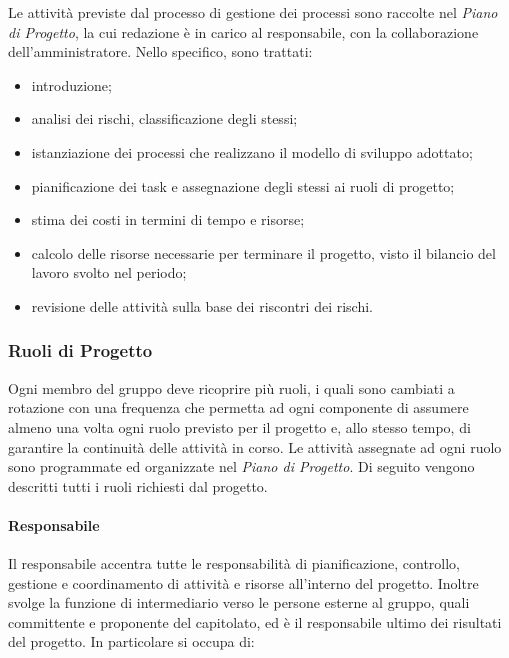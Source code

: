 		Le attività previste dal processo di gestione dei processi sono raccolte nel \textit{Piano di Progetto}, la cui redazione è in carico al responsabile, con la collaborazione dell'amministratore.\newline
		Nello specifico, sono trattati:
		
		\begin{itemize}
			\item introduzione;
			\item analisi dei rischi, classificazione degli stessi;
			\item istanziazione dei processi che realizzano il modello di sviluppo adottato;
			\item pianificazione dei task e assegnazione degli stessi ai ruoli di progetto;
			\item stima dei costi in termini di tempo e risorse;
			\item calcolo delle risorse necessarie per terminare il progetto, visto il bilancio del lavoro svolto nel periodo;
			\item revisione delle attività sulla base dei riscontri dei rischi.
		\end{itemize}
	
	\subsubsection{Ruoli di Progetto}
	
		Ogni membro del gruppo deve ricoprire più ruoli, i quali sono cambiati a rotazione con una frequenza che permetta ad ogni componente di assumere almeno una volta ogni ruolo previsto per il progetto e, allo stesso tempo, di garantire la continuità delle attività in corso.\newline
		Le attività assegnate ad ogni ruolo sono programmate ed organizzate nel \textit{Piano di Progetto}.\newline
		Di seguito vengono descritti tutti i ruoli richiesti dal progetto.
	
		\paragraph{Responsabile}
		
			Il responsabile accentra tutte le responsabilità di pianificazione, controllo, gestione e coordinamento di attività e risorse all'interno del progetto. Inoltre svolge la funzione di intermediario verso le persone esterne al gruppo, quali committente e proponente del capitolato, ed è il responsabile ultimo dei risultati del progetto.\newline
			In particolare si occupa di:
			
